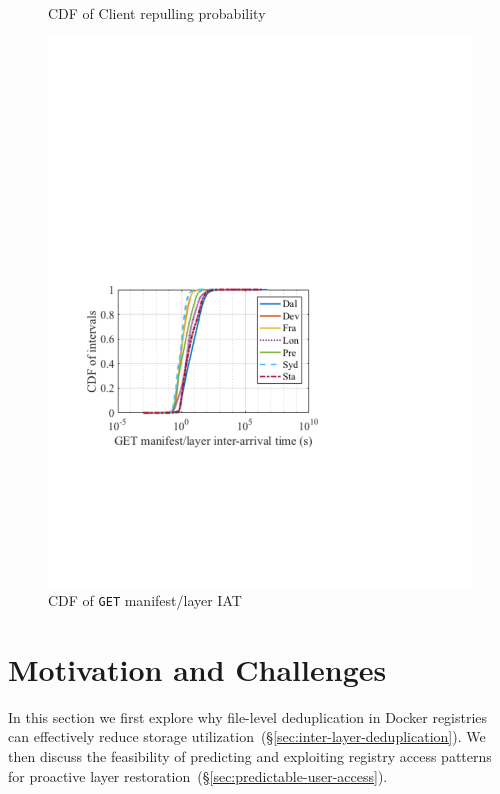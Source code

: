 \begin{figure}[t]
\begin{minipage}{0.265\textwidth}
                \caption{CDF of Client repulling probability}%
                \label{fig:client-repull-cdf}
        \end{minipage}%
\hspace{1mm}
        \begin{minipage}{0.25\textwidth}
        \centering
        \includegraphics[width=\textwidth]{graphs/GML-intervals.pdf}
        \caption{CDF of \texttt{GET} manifest/layer IAT}
        \label{fig:intervals}
        \end{minipage}
\end{figure}



\section{Motivation and Challenges}
\label{sec:dataset-analysis}

In this section we first explore why file-level deduplication in Docker
registries can effectively reduce storage
utilization~(\S\ref{sec:inter-layer-deduplication}).
%
We then discuss the feasibility of predicting and exploiting registry access
patterns for proactive layer restoration~(\S\ref{sec:predictable-user-access}).

